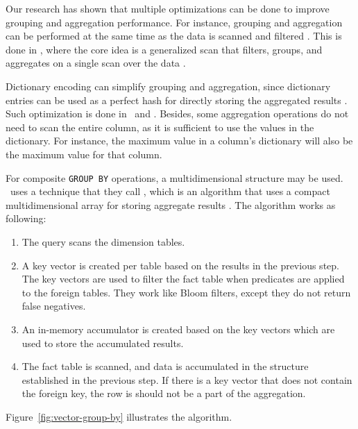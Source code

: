 Our research has shown that multiple optimizations can be done to improve grouping and aggregation performance. For instance, grouping and aggregation can be performed at the same time as the data is scanned and filtered \cite{Lemke2010-is}. This is done in \blink, where the core idea is a generalized scan that filters, groups, and aggregates on a single scan over the data \cite{Raman2008-gi}.

Dictionary encoding can simplify grouping and aggregation, since dictionary entries can be used as a perfect hash for directly storing the aggregated results \cite{Boncz2005-wj, Lemke2010-is}. Such optimization is done in \monetx~and \blink. Besides, some aggregation operations do not need to scan the entire column, as it is sufficient to use the values in the dictionary. For instance, the maximum value in a column's dictionary will also be the maximum value for that column.



For composite \texttt{GROUP BY} operations, a multidimensional structure may be used. \oracle~uses a technique that they call , which is an algorithm that uses a compact multidimensional array for storing aggregate results \cite{Oracle2015-fs}. The  algorithm works as following:
\begin{enumerate}
  \item The query scans the dimension tables.
  \item A key vector is created per table based on the results in the previous step. The key vectors are used to filter the fact table when predicates are applied to the foreign tables. They work like Bloom filters, except they do not return false negatives.
  \item An in-memory accumulator is created based on the key vectors which are used to store the accumulated results.
  \item The fact table is scanned, and data is accumulated in the structure established in the previous step. If there is a key vector that does not contain the foreign key, the row is should not be a part of the aggregation.
\end{enumerate}

Figure~\ref{fig:vector-group-by} illustrates the  algorithm.


